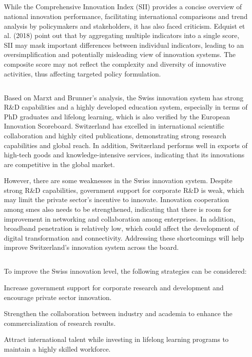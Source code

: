 \documentclass[UTF8,a4paper,AutoFakeBold,AutoFakeSlant]{article}
\begin{document}
\subsection{}

While the Comprehensive Innovation Index (SII) provides a concise overview of national innovation performance, facilitating international comparisons and trend analysis by policymakers and stakeholders, it has also faced criticism. Edquist et al. (2018) point out that by aggregating multiple indicators into a single score, SII may mask important differences between individual indicators, leading to an oversimplification and potentially misleading view of innovation systems. The composite score may not reflect the complexity and diversity of innovative activities, thus affecting targeted policy formulation.

\subsection{}

Based on Marxt and Brunner's analysis, the Swiss innovation system has strong R\&D capabilities and a highly developed education system, especially in terms of PhD graduates and lifelong learning, which is also verified by the European Innovation Scoreboard. Switzerland has excelled in international scientific collaboration and highly cited publications, demonstrating strong research capabilities and global reach. In addition, Switzerland performs well in exports of high-tech goods and knowledge-intensive services, indicating that its innovations are competitive in the global market.

However, there are some weaknesses in the Swiss innovation system. Despite strong R\&D capabilities, government support for corporate R\&D is weak, which may limit the private sector's incentive to innovate. Innovation cooperation among smes also needs to be strengthened, indicating that there is room for improvement in networking and collaboration among enterprises. In addition, broadband penetration is relatively low, which could affect the development of digital transformation and connectivity. Addressing these shortcomings will help improve Switzerland's innovation system across the board.

\subsection{}

To improve the Swiss innovation level, the following strategies can be considered:

Increase government support for corporate research and development and encourage private sector innovation.

Strengthen the collaboration between industry and academia to enhance the commercialization of research results.

Attract international talent while investing in lifelong learning programs to maintain a highly skilled workforce.



% 
% 
% 
\end{document}
